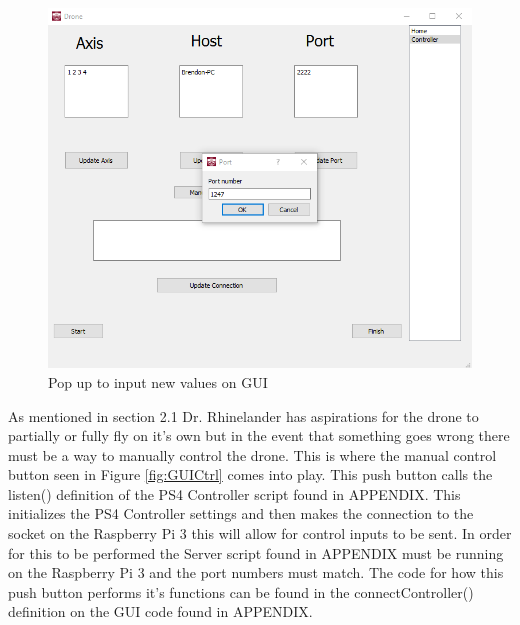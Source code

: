 \begin{figure}[H]
	\includegraphics[width=\linewidth]{GUIPopup.png}
	\caption{Pop up to input new values on GUI}
	\label{fig:popup}
\end{figure}

As mentioned in section 2.1 Dr. Rhinelander has aspirations for the drone to partially or fully fly on it's own but in the event that something goes wrong there must be a way to manually control the drone. This is where the manual control button seen in Figure \ref{fig:GUICtrl} comes into play. This push button calls the listen() definition of the PS4 Controller script found in APPENDIX. This initializes the PS4 Controller settings and then makes the connection to the socket on the Raspberry Pi 3 this will allow for control inputs to be sent. In order for this to be performed the Server script found in APPENDIX must be running on the Raspberry Pi 3 and the port numbers must match. The code for how this push button performs it's functions can be found in the connectController() definition on the GUI code found in APPENDIX.




